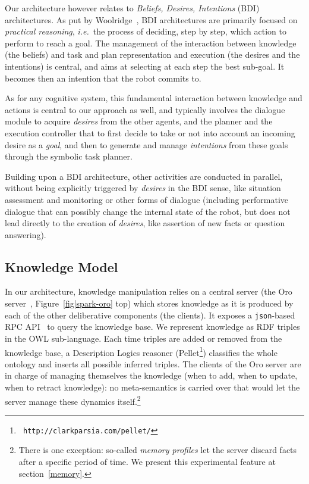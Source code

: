 \documentclass[preprint,3p,times]{elsarticle}
\newcommand{\ie}{{\textit{i.e.\ }}}
\begin{document}
Our architecture however relates to \emph{Beliefs, Desires, Intentions} (BDI)
architectures. As put by Woolridge~\cite{Woolridge1999}, BDI architectures are
primarily focused on \emph{practical reasoning}, \ie the process of deciding,
step by step, which action to perform to reach a goal. The management of the
interaction between knowledge (the beliefs) and task and plan representation and
execution (the desires and the intentions) is central, and aims at selecting at
each step the best sub-goal. It becomes then an intention that the robot commits
to.

As for any cognitive system, this fundamental interaction between knowledge and
actions is central to our approach as well, and typically involves the dialogue
module to acquire \emph{desires} from the other agents, and the planner and the
execution controller that to first decide to take or not into account an
incoming desire as a \emph{goal}, and then to generate and manage
\emph{intentions} from these goals through the symbolic task planner.

Building upon a BDI architecture, other activities are conducted in parallel,
without being explicitly triggered by \emph{desires} in the BDI sense, like
situation assessment and monitoring or other forms of dialogue (including
performative dialogue that can possibly change the internal state of the robot,
but does not lead directly to the creation of \emph{desires}, like assertion of
new facts or question answering).

\subsection{Knowledge Model}

In our architecture, knowledge manipulation relies on a central server (the {\sc
Oro} server~\cite{Lemaignan2010}, Figure~\ref{fig|spark-oro} top) which stores
knowledge as it is produced by each of the other deliberative components (the
clients). It exposes a {\tt json}-based RPC API~\cite{lemaignan2012kbapi} to
query the knowledge base.  We represent knowledge as RDF triples in the OWL
sub-language. Each time triples are added or removed from the knowledge base, a
Description Logics reasoner ({\sc Pellet}\footnote{\tt
http://clarkparsia.com/pellet/}) classifies the whole ontology and inserts all
possible inferred triples.  The clients of the {\sc Oro} server are in charge of
managing themselves the knowledge (when to add, when to update, when to retract
knowledge): no meta-semantics is carried over that would let the server manage
these dynamics itself.\footnote{There is one exception: so-called \emph{memory
profiles} let the server discard facts after a specific period of time. We
present this experimental feature at section~\ref{memory}.}
\end{document}
